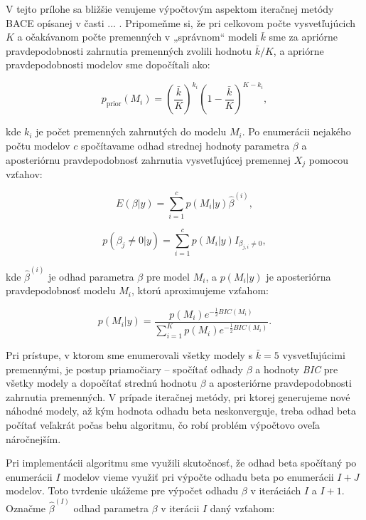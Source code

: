 V tejto prílohe sa bližšie venujeme výpočtovým aspektom iteračnej metódy BACE opísanej v časti ... .
Pripomeňme si, že pri celkovom počte vysvetľujúcich \(K\) a očakávanom počte premenných v „správnom“ modeli \(\bar{k}\)
sme za apriórne pravdepodobnosti zahrnutia premenných zvolili hodnotu \(\bar{k}/K\), a apriórne pravdepodobnosti modelov sme dopočítali ako:

\[
p_{\text{prior}}(M_i) = \left( \frac{\bar{k}}{K} \right)^{k_i} \left( 1 - \frac{\bar{k}}{K} \right)^{K - k_i},
\]

kde \( k_i \) je počet premenných zahrnutých do modelu \( M_i \).
Po enumerácii nejakého počtu modelov \(c\) spočítavame odhad strednej hodnoty parametra \(\beta\) a aposteriórnu pravdepodobnosť zahrnutia vysvetľujúcej premennej \(X_j\) pomocou vzťahov:

\[
    E(\beta | y) = \sum_{i = 1}^{c} p(M_i | y) \hat{\beta}^{(i)},
\]

\[
    p(\beta_j \neq 0 | y) = \sum_{i = 1}^{c} p(M_i | y) I_{\beta_{j, i} \neq 0},
\]

kde \(\hat{\beta}^{(i)}\) je odhad parametra \(\beta\) pre model \(M_i\), a \(p(M_i | y)\) je aposteriórna pravdepodobnosť modelu \(M_i\), ktorú aproximujeme vzťahom:

\[
    p(M_i | y) = \frac{p(M_i) e^{-\frac{1}{2}BIC(M_i)}}{\sum_{i = 1}^{K} p(M_i) e^{-\frac{1}{2}BIC(M_i)}}.
\]

Pri prístupe, v ktorom sme enumerovali všetky modely s \(\bar{k} = 5\) vysvetľujúcimi premennými, je postup priamočiary –
spočítať odhady \(\beta\) a hodnoty \emph{BIC} pre všetky modely a dopočítať strednú hodnotu \(\beta\) a aposteriórne pravdepodobnosti zahrnutia premenných.
V prípade iteračnej metódy, pri ktorej generujeme nové náhodné modely, až kým hodnota odhadu beta neskonverguje,
treba odhad beta počítať veľakrát počas behu algoritmu, čo robí problém výpočtovo oveľa náročnejším.

Pri implementácii algoritmu sme využili skutočnosť, že odhad beta spočítaný po enumerácii \(I\) modelov vieme využiť pri výpočte odhadu beta po enumerácii \(I + J\) modelov.
Toto tvrdenie ukážeme pre výpočet odhadu \(\beta\) v iteráciách \(I\) a \(I + 1\).
Označme \(\hat{\beta}^{(I)}\) odhad parametra \(\beta\) v iterácii \(I\) daný vzťahom:


